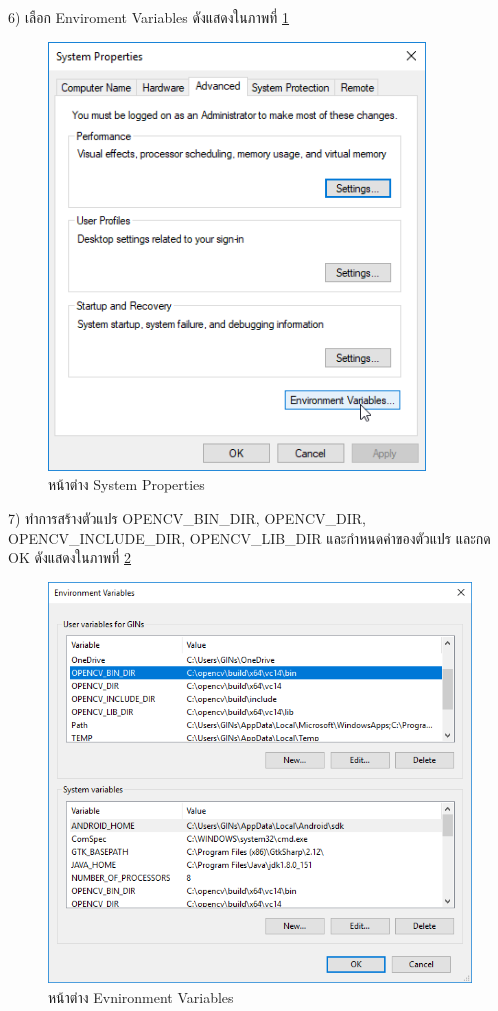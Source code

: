     6) เลือก Enviroment Variables ดังแสดงในภาพที่ \ref{Fig:opencvInstall6}
        \begin{figure}[H]
            \centering\includegraphics[width=10cm]{Figures/7/12}
            \caption{หน้าต่าง System Properties}
            \label{Fig:opencvInstall6}
        \end{figure}

    7) ทำการสร้างตัวแปร {OPENCV\_BIN\_DIR}, {OPENCV\_DIR}, {OPENCV\_INCLUDE\_DIR}, {OPENCV\_LIB\_DIR} 
    และกำหนดค่าของตัวแปร และกด OK ดังแสดงในภาพที่ \ref{Fig:opencvInstall7}
    \begin{figure}[H]
        \includegraphics[width=\columnwidth]{Figures/7/13}
        \caption{หน้าต่าง Evnironment Variables}
        \label{Fig:opencvInstall7}
    \end{figure}